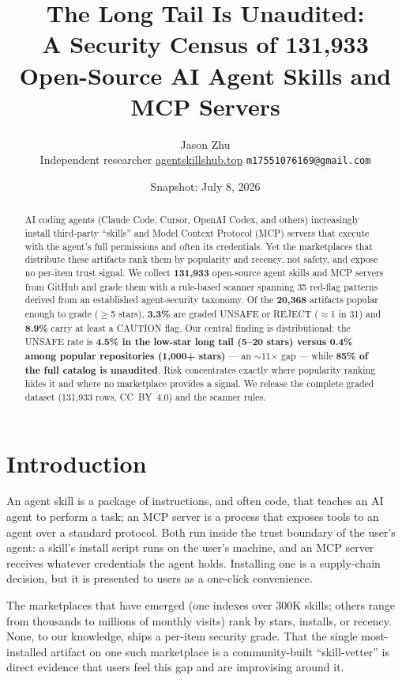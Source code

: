 \documentclass[11pt]{article}
\title{The Long Tail Is Unaudited:\\A Security Census of 131,933 Open-Source AI Agent Skills and MCP Servers}
\author{Jason Zhu\\Independent researcher \quad \href{https://agentskillshub.top}{agentskillshub.top} \quad \texttt{m17551076169@gmail.com}}
\date{Snapshot: July 8, 2026}
\begin{document}
\maketitle

\begin{abstract}
AI coding agents (Claude Code, Cursor, OpenAI Codex, and others) increasingly
install third-party ``skills'' and Model Context Protocol (MCP) servers that
execute with the agent's full permissions and often its credentials. Yet the
marketplaces that distribute these artifacts rank them by popularity and
recency, not safety, and expose no per-item trust signal. We collect
\textbf{131,933} open-source agent skills and MCP servers from GitHub and grade
them with a rule-based scanner spanning 35 red-flag patterns derived from an
established agent-security taxonomy. Of the \textbf{20,368} artifacts popular
enough to grade ($\geq$5 stars), \textbf{3.3\%} are graded UNSAFE or REJECT
($\approx$1 in 31) and \textbf{8.9\%} carry at least a CAUTION flag. Our
central finding is distributional: the UNSAFE rate is \textbf{4.5\% in the
low-star long tail (5--20 stars) versus 0.4\% among popular repositories
(1,000+ stars)} --- an $\sim$11$\times$ gap --- while \textbf{85\% of the full
catalog is unaudited}. Risk concentrates exactly where popularity ranking
hides it and where no marketplace provides a signal. We release the complete
graded dataset (131,933 rows, CC~BY~4.0) and the scanner rules.
\end{abstract}

\section{Introduction}

An agent skill is a package of instructions, and often code, that teaches an
AI agent to perform a task; an MCP server is a process that exposes tools to
an agent over a standard protocol. Both run inside the trust boundary of the
user's agent: a skill's install script runs on the user's machine, and an MCP
server receives whatever credentials the agent holds. Installing one is a
supply-chain decision, but it is presented to users as a one-click
convenience.

The marketplaces that have emerged (one indexes over 300K skills; others range
from thousands to millions of monthly visits) rank by stars, installs, or
recency. None, to our knowledge, ships a per-item security grade. That the
single most-installed artifact on one such marketplace is a community-built
``skill-vetter'' is direct evidence that users feel this gap and are
improvising around it.
\end{document}
